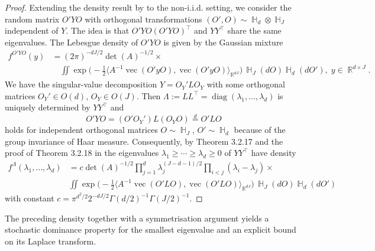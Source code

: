 \documentclass[preprint,aos]{imsart}
\numberwithin{equation}{section}
\theoremstyle{remark}
\DeclareMathOperator{\R}{{\mathbb R}}
\DeclareMathOperator{\HH}{{\mathbb H}}
\DeclareMathOperator{\diag}{diag} \DeclareMathOperator{\KL}{KL}
\DeclareMathOperator{\vek}{vec}
\providecommand{\scapro}[2]{\langle #1,#2 \rangle}
\renewcommand{\ge}{\geqslant}
\begin{document}
\begin{appendix}
\begin{proof}
Extending the density result by \citet{James1960} to the non-i.i.d. setting, we consider the random matrix $O'YO$ with orthogonal transformations  $(O',O)\sim \HH_d\otimes \HH_J$ independent of $Y$. The idea is that $O'YO(O'YO)^\top$ and $YY^\top$ share the same eigenvalues. The Lebesgue density of $O'YO$ is given by the Gaussian mixture
\begin{align*}
f^{O'YO}(y)&=(2\pi)^{-dJ/2} \det(A)^{-1/2}\times\\
&\quad  \iint \exp\Big(-\frac12\scapro{A^{-1}\vek(O'yO)}{\vek(O' yO)}_{\R^{dJ}}\Big)\,\HH_J(dO)\HH_d(dO'),\; y\in\R^{d\times J}.
\end{align*}
We have the singular-value decomposition $Y=O_Y' L O_Y$ with some orthogonal matrices $O_Y'\in O(d)$, $O_Y\in O(J)$. Then $\Lambda:=LL^\top=\diag(\lambda_1,\ldots,\lambda_d)$ is uniquely determined by $YY^\top$ and
\[ O'YO=(O'O_Y')L(O_YO)\stackrel{d}{=} O'LO\]
holds for independent orthogonal matrices $O\sim \HH_J$, $O'\sim\HH_d$ because of the group invariance of Haar measure. Consequently, by Theorem 3.2.17 and the proof of Theorem 3.2.18 in \cite{muirhead2009} the eigenvalues $\lambda_1\ge\cdots\ge\lambda_d\ge 0$ of $YY^\top$ have density
\begin{align*}
f^\Lambda(\lambda_1,\ldots,\lambda_{d})&=c\det(A)^{-1/2}\prod_{j=1}^{d}\lambda_j^{(J-d-1)/2}\prod_{i<j}(\lambda_i-\lambda_j)\times\\
&
\iint \exp\Big(-\frac12\scapro{A^{-1}\vek(O' L O)}{\vek(O'LO)}_{\R^{dJ}}\Big)\,\HH_J(dO)\HH_d(dO')
\end{align*}
with constant $c=\pi^{d^2/2}2^{-dJ/2}\Gamma(d/2)^{-1}\Gamma(J/2)^{-1}$.
\end{proof}

The preceding density together with a symmetrisation argument yields a stochastic dominance property for the smallest eigenvalue and an explicit bound on its Laplace transform.


\end{appendix}
\end{document}
